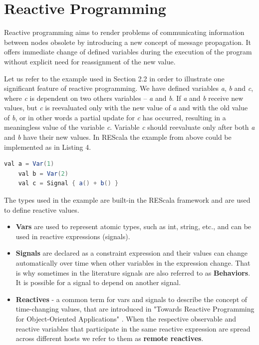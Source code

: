 \documentclass{sigplanconf}
\begin{document}
\section{Reactive Programming}

Reactive programming aims to render problems of communicating information between nodes obsolete by introducing a new concept of message propagation. It offers immediate change of defined variables during the execution of the program without explicit need for reassignment of the new value.

Let us refer to the example used in Section 2.2 in order to illustrate one significant feature of reactive programming. We have defined variables \textit{a}, \textit{b} and \textit{c}, where \textit{c}  is dependent on two others variables --  \textit{a} and \textit{b}. If \textit{a} and \textit{b} receive new values, but \textit{c} is reevaluated only with the new value of \textit{a} and with the old value of \textit{b}, or in other words a partial update for \textit{c} has occurred, resulting in a meaningless value of the variable \textit{c}. Variable \textit{c} should reevaluate only after both \textit{a} and \textit{b} have their new values.
In REScala the example from above could be implemented as in Listing 4.

\begin{lstlisting}[frame=single,caption={Reactive Sum},captionpos=b,linewidth=\columnwidth, basicstyle=\small, language=java, morekeywords={val, Signal}, keywordstyle=\color{blue}]
	val a = Var(1)
	val b = Var(2)
	val c = Signal { a() + b() }
\end{lstlisting}

The types used in the example are built-in the REScala framework and are used to define reactive values.

\begin{itemize} \itemsep1pt \parskip0pt 
  \item \textbf{Vars} are used to represent atomic types, such as int, string, etc., and can be used in reactive expressions (signals).
  \item \textbf{Signals} are declared as a constraint expression and their values can change automatically over time when other variables in the expression change. That is why sometimes in the literature signals are also referred to as \textbf{Behaviors}. It is possible for a signal to depend on another signal. 
  \item \textbf{Reactives} - a common term for vars and signals to describe the concept of time-changing values, that are introduced in "Towards Reactive Programming for Object-Oriented Applications" \cite{towards} . When the respective observable and reactive variables that participate in the same reactive expression are spread across different hosts we refer to them as \textbf{remote reactives}.

\end{itemize}
\end{document}
